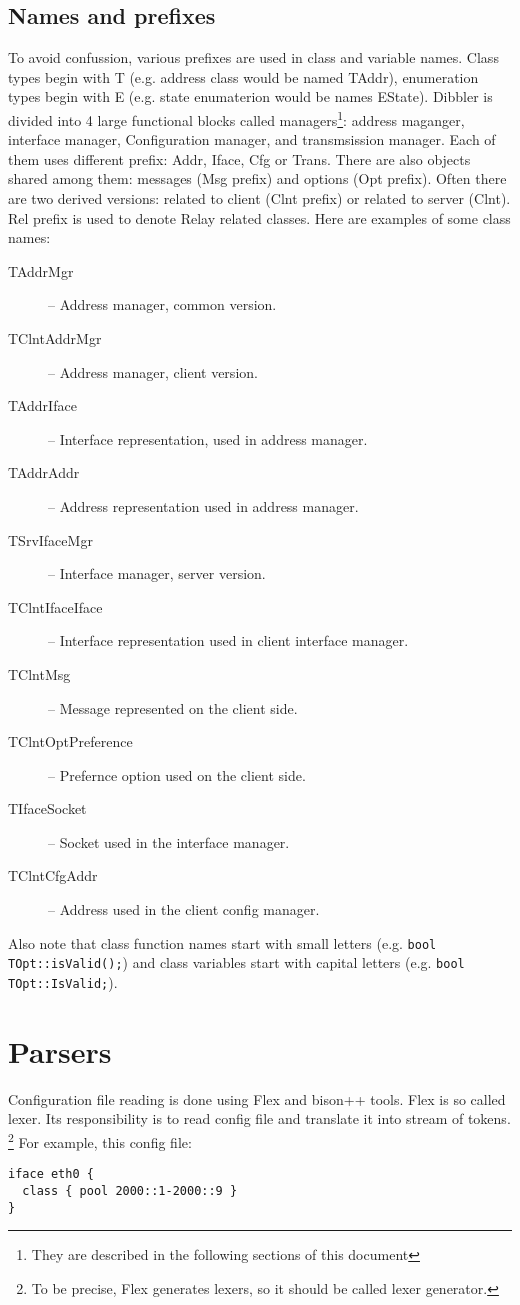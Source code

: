 \subsection{Names and prefixes}
To avoid confussion, various prefixes are used in class and variable
names. Class types begin with T (e.g. address class would be named
TAddr), enumeration types begin with E (e.g. state enumaterion would
be names EState). Dibbler is divided into 4 large functional blocks
called managers\footnote{They are described in the following sections
  of this document}: address maganger, interface manager, Configuration
manager, and transmsission manager. Each of them uses different
prefix: Addr, Iface, Cfg or Trans. There are also objects shared among
them: messages (Msg prefix) and options (Opt prefix). Often there are
two derived versions: related to client (Clnt prefix) or related to
server (Clnt). Rel prefix is used to denote Relay related classes. 
Here are examples of some class names:
\begin{description}
\item[TAddrMgr] -- Address manager, common version.
\item[TClntAddrMgr] -- Address manager, client version.
\item[TAddrIface] -- Interface representation, used in address manager.
\item[TAddrAddr] -- Address representation used in address manager.
\item[TSrvIfaceMgr] -- Interface manager, server version.
\item[TClntIfaceIface] -- Interface representation used in client
  interface manager.
\item[TClntMsg] -- Message represented on the client side.
\item[TClntOptPreference] -- Prefernce option used on the client side.
\item[TIfaceSocket] -- Socket used in the interface manager.
\item[TClntCfgAddr] -- Address used in the client config manager.
\end{description}

Also note that class function names start with small letters
(e.g. \verb+bool TOpt::isValid();+) and class variables start with capital
letters (e.g. \verb+bool TOpt::IsValid;+).

\section{Parsers}
Configuration file reading is done using Flex and bison++ tools. Flex
is so called lexer. Its responsibility is to read config file and
translate it into stream of tokens. \footnote{To be precise, Flex
  generates lexers, so it should be called lexer generator.} For
example, this config file:
\begin{verbatim}
iface eth0 {
  class { pool 2000::1-2000::9 }
}
\end{verbatim}

